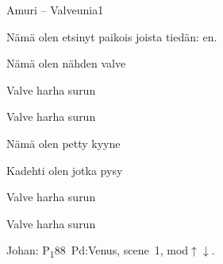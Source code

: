 \documentclass[12pt,a4paper]{article}
\begin{document}
\thispagestyle{empty}
\begin{mysong}{Amuri – Valveunia}{1}

\begin{SBVerse}
  Nämä  olen etsinyt  paikois joista
  tiedän:  en.

  Nämä  olen  nähden 
  valve
\end{SBVerse}

\begin{SBChorus}
  Valve harha surun 

  Valve harha surun 
\end{SBChorus}


\begin{SBVerse}
  Nämä  olen  petty
  kyyne

  Kadehti olen  jotka 
  pysy
\end{SBVerse}

\begin{SBChorus}
  Valve harha surun 

  Valve harha surun 
\end{SBChorus}


{\SBLyricNoteFont Johan: P\textsubscript{1}88~Pd:Venus, scene~1,
mod$\uparrow\downarrow$.}

\end{mysong}
\end{document}
